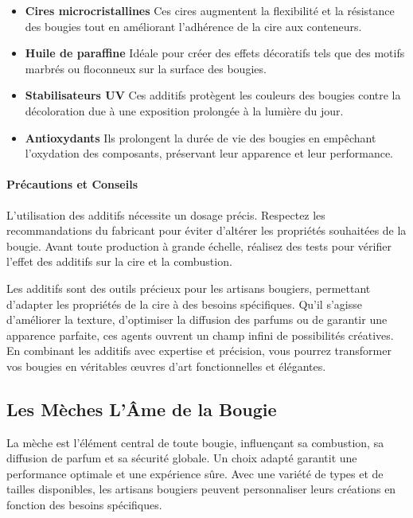 \documentclass[11pt,fleqn,onecolumn,oneside]{book}
\begin{document}
\begin{itemize}
    \item \textbf{Cires microcristallines} Ces cires augmentent la flexibilité et la résistance des bougies tout en améliorant l’adhérence de la cire aux conteneurs.
    \item \textbf{Huile de paraffine} Idéale pour créer des effets décoratifs tels que des motifs marbrés ou floconneux sur la surface des bougies.
    \item \textbf{Stabilisateurs UV} Ces additifs protègent les couleurs des bougies contre la décoloration due à une exposition prolongée à la lumière du jour.
    \item \textbf{Antioxydants} Ils prolongent la durée de vie des bougies en empêchant l’oxydation des composants, préservant leur apparence et leur performance.
\end{itemize}

\paragraph{Précautions et Conseils}

\begin{remark}
L’utilisation des additifs nécessite un dosage précis. Respectez les recommandations du fabricant pour éviter d’altérer les propriétés souhaitées de la bougie. Avant toute production à grande échelle, réalisez des tests pour vérifier l’effet des additifs sur la cire et la combustion.
\end{remark}

\begin{corollary}
Les additifs sont des outils précieux pour les artisans bougiers, permettant d’adapter les propriétés de la cire à des besoins spécifiques. Qu’il s’agisse d’améliorer la texture, d’optimiser la diffusion des parfums ou de garantir une apparence parfaite, ces agents ouvrent un champ infini de possibilités créatives. En combinant les additifs avec expertise et précision, vous pourrez transformer vos bougies en véritables œuvres d’art fonctionnelles et élégantes.
\end{corollary}

\subsection*{Les Mèches L’Âme de la Bougie}

\begin{definition}
La mèche est l’élément central de toute bougie, influençant sa combustion, sa diffusion de parfum et sa sécurité globale. Un choix adapté garantit une performance optimale et une expérience sûre. Avec une variété de types et de tailles disponibles, les artisans bougiers peuvent personnaliser leurs créations en fonction des besoins spécifiques.
\end{definition}
\end{document}

